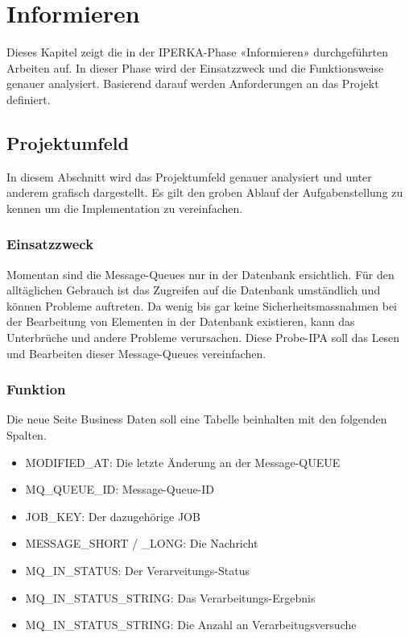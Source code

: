 \chapter{Informieren}\label{ch:informieren}
Dieses Kapitel zeigt die in der IPERKA-Phase «Informieren» durchgeführten Arbeiten auf. In dieser Phase wird der Einsatzzweck und die Funktionsweise genauer analysiert. Basierend darauf werden Anforderungen an das Projekt definiert.

\section{Projektumfeld}
In diesem Abschnitt wird das Projektumfeld genauer analysiert und unter anderem grafisch dargestellt. Es gilt den groben Ablauf der Aufgabenstellung zu kennen um die Implementation zu vereinfachen.

\subsection{Einsatzzweck}
Momentan sind die Message-Queues nur in der Datenbank ersichtlich. Für den alltäglichen Gebrauch ist das Zugreifen auf die Datenbank umständlich und können Probleme auftreten. Da wenig bis gar keine Sicherheitsmassnahmen bei der Bearbeitung von Elementen in der Datenbank existieren, kann das Unterbrüche und andere Probleme verursachen. Diese Probe-IPA soll das Lesen und Bearbeiten dieser Message-Queues vereinfachen.

\subsection{Funktion}
Die neue Seite Business Daten soll eine Tabelle beinhalten mit den folgenden Spalten.
\begin{itemize}
	\item MODIFIED\_AT: Die letzte Änderung an der Message-QUEUE
	\item MQ\_QUEUE\_ID: Message-Queue-ID
	\item JOB\_KEY: Der dazugehörige JOB
	\item MESSAGE\_SHORT / \_LONG: Die Nachricht
	\item MQ\_IN\_STATUS: Der Verarveitungs-Status
	\item MQ\_IN\_STATUS\_STRING: Das Verarbeitungs-Ergebnis
	\item MQ\_IN\_STATUS\_STRING: Die Anzahl an Verarbeitugsversuche
\end{itemize}

